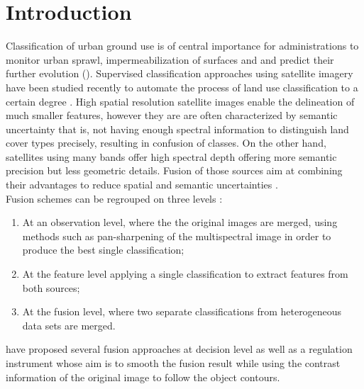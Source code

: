 \documentclass[10pt]{article}
\begin{document}
\makeMATIS


\tableofcontents
\newpage
\section{Introduction}

Classification of urban ground use is of central importance for administrations to monitor urban sprawl, impermeabilization of surfaces and and predict their further evolution (\cite{kurtz_histogram_2012,kurtz_extraction_2012,wemmert_multiresolution_2009}). Supervised classification approaches using satellite imagery have been studied recently to automate the process of land use classification to a certain degree  \parencite{inglada_operational_2017,li_urban_2016}. High spatial resolution satellite images enable the delineation of much smaller features, however they are are often characterized by semantic uncertainty that is, not having enough spectral information to distinguish land cover types precisely, resulting in confusion of classes. On the other hand, satellites using many bands offer high spectral depth offering more semantic precision but less geometric details. Fusion of those sources aim at combining their advantages to reduce spatial and semantic uncertainties \parencite{ouerghemmi_two-step_2017,fauvel_decision_fusion,hervieu_fusion_2016}. \\

Fusion schemes can be regrouped on three levels \parencite{ouerghemmi_two-step_2017}:
\begin{enumerate}
    \item At an observation level, where the the original images are merged, using methods such as pan-sharpening of the multispectral image in order to produce the best single classification;
    \item At the feature level applying a single classification to extract features from both sources;
    \item At the fusion level, where two separate classifications from heterogeneous data sets are merged.
\end{enumerate}

\cite{ouerghemmi_two-step_2017} have proposed several fusion approaches at decision level as well as a regulation instrument whose aim is to smooth the fusion result while using the contrast information of the original image to follow the object contours. \\
\end{document}
